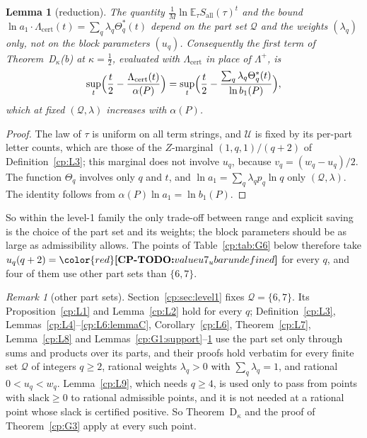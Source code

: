 \documentclass[11pt]{article}
\makeatletter
\newtheorem{lemma}[theorem]{Lemma}
\theoremstyle{definition}
\theoremstyle{remark}
\newtheorem{remark}[theorem]{Remark}
\DeclareRobustCommand{\CPTODO}[1]{{\color{red}\textbf{[CP-TODO:} #1\textbf{]}}}
\newcommand{\Lamp}{\Lambda^{+}}               %
\newcommand{\Lamcert}{\Lambda_{\mathrm{cert}}}%
\newcommand{\ThmDk}{Theorem~D\texorpdfstring{\ensuremath{_\kappa}}{\_kappa}}     %
\newcommand{\Qs}{\mathcal{Q}}                 %
\newcommand{\slack}{\mathrm{slack}}           %
\newcommand{\Sall}{S_{\mathrm{all}}}          %
\newcommand{\Ukept}{\mathcal{U}}              %
\newcommand{\cpv}[1]{\ifcsname cpv@#1\endcsname\csname cpv@#1\endcsname\else\CPTODO{value #1 undefined}\fi}
\makeatother
\begin{document}
\begin{lemma}[reduction]\label{cp:G5}
The quantity $\frac1M\ln\mathbb E_\tau\Sall(\tau)^t$ and the bound $\ln a_1\cdot\Lamcert(t)=\sum_q\lambda_q\Theta^*_q(t)$ depend on the part set $\Qs$ and the weights $(\lambda_q)$ only, not on the block parameters $(u_q)$. Consequently the first term of \ThmDk{}(b) at $\kappa=\frac12$, evaluated with $\Lamcert$ in place of $\Lamp$, is
\[
\sup_t\Bigl(\frac t2-\frac{\Lamcert(t)}{\alpha(P)}\Bigr)=\sup_t\Bigl(\frac t2-\frac{\sum_q\lambda_q\Theta^*_q(t)}{\ln b_1(P)}\Bigr),
\]
which at fixed $(\Qs,\lambda)$ increases with $\alpha(P)$.
\end{lemma}

\begin{proof}
The law of $\tau$ is uniform on all term strings, and $\Ukept$ is fixed by its per-part letter counts, which are those of the $Z$-marginal $(1,q,1)/(q+2)$ of Definition~\ref{cp:L3}; this marginal does not involve $u_q$, because $v_q=(w_q-u_q)/2$. The function $\Theta_q$ involves only $q$ and $t$, and $\ln a_1=\sum_q\lambda_qp_q\ln q$ only $(\Qs,\lambda)$. The identity follows from $\alpha(P)\ln a_1=\ln b_1(P)$.
\end{proof}

So within the level-1 family the only trade-off between range and explicit saving is the choice of the part set and its weights; the block parameters should be as large as admissibility allows. The points of Table~\ref{cp:tab:G6} below therefore take $u_q(q+2)=\cpv{u7_ubar}$ for every $q$, and four of them use other part sets than $\{6,7\}$.

\begin{remark}[other part sets]\label{cp:G6:parts}
Section~\ref{cp:sec:level1} fixes $\Qs=\{6,7\}$. Its Proposition~\ref{cp:L1} and Lemma~\ref{cp:L2} hold for every $q$; Definition~\ref{cp:L3}, Lemmas~\ref{cp:L4}--\ref{cp:L6:lemmaC}, Corollary~\ref{cp:L6}, Theorem~\ref{cp:L7}, Lemma~\ref{cp:L8} and Lemmas~\ref{cp:G1:support}--\ref{cp:G5} use the part set only through sums and products over its parts, and their proofs hold verbatim for every finite set $\Qs$ of integers $q\ge2$, rational weights $\lambda_q>0$ with $\sum_q\lambda_q=1$, and rational $0<u_q<w_q$. Lemma~\ref{cp:L9}, which needs $q\ge4$, is used only to pass from points with $\slack\ge0$ to rational admissible points, and it is not needed at a rational point whose slack is certified positive. So \ThmDk{} and the proof of Theorem~\ref{cp:G3} apply at every such point.
\end{remark}
\end{document}
